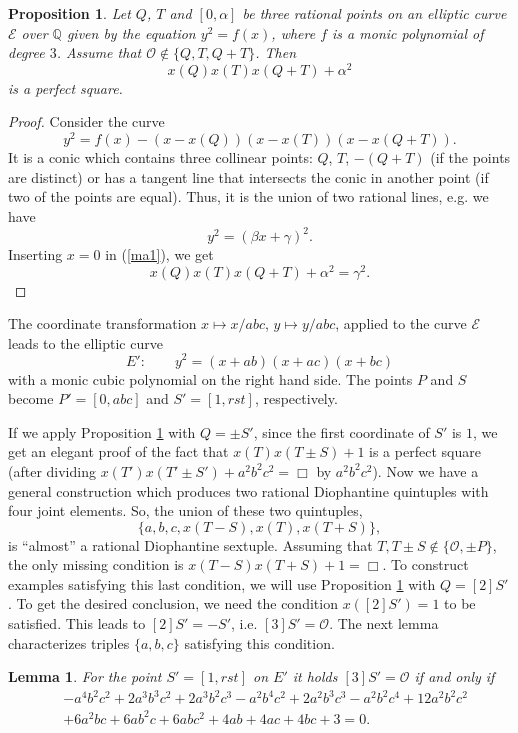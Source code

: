 \documentclass[11pt]{amsart}
\theoremstyle{plain}
\newtheorem{proposition}{Proposition}
\newtheorem{lemma}{Lemma}
\theoremstyle{remark}
\begin{document}
\begin{proposition}
\label{matija}
Let $Q$, $T$ and $[0,\alpha]$ be three rational points on an elliptic curve $\mathcal{E}$ over $\mathbb{Q}$
given by the equation $y^2=f(x)$, where $f$ is a monic polynomial of degree $3$.
Assume that $\mathcal{O} \not\in \{Q,T,Q+T\}$.
Then
$$ x(Q)x(T)x(Q+T)+ \alpha^2 $$
is a perfect square.
\end{proposition}

\begin{proof}
Consider the curve
$$
y^2 = f(x)-(x-x(Q))(x-x(T))(x-x(Q+T)).
$$
It is a conic which contains three collinear points: $Q$, $T$, $-(Q+T)$ (if the points are distinct) or has a tangent line that intersects the conic in another point (if two of the points are equal). Thus, it is the union of two rational lines, e.g. we have
\begin{equation}
\label{ma1}
y^2 = (\beta x + \gamma)^2.
\end{equation}
Inserting $x=0$ in (\ref{ma1}), we get
$$
x(Q)x(T)x(Q+T)+ \alpha^2 = \gamma^2.
$$
\end{proof}

The coordinate transformation $x\mapsto x/abc$, $y\mapsto y/abc$, applied to the curve $\mathcal{E}$
leads to the elliptic curve
$$ E': \qquad y^2=(x+ab)(x+ac)(x+bc) $$
with a monic cubic polynomial on the right hand side. The points $P$ and $S$ become
$P'=[0,abc]$ and $S'=[1, rst]$, respectively.

If we apply Proposition \ref{matija} with $Q=\pm S'$, since the first coordinate of $S'$ is $1$, we get an elegant proof of the fact that $x(T)x(T\pm S)+1$ is a perfect square (after dividing $x(T')x(T'\pm S') + a^2b^2c^2=\Box$ by $a^2b^2c^2$). Now we have a general construction which produces two rational Diophantine quintuples with four joint elements. So, the union of these two quintuples,
$$
\{a,b,c,x(T-S),x(T),x(T+S)\},
$$
is ``almost'' a rational Diophantine sextuple. Assuming that $T,T\pm S \not\in \{\mathcal{O}, \pm P\}$, the only missing condition is $x(T-S)x(T+ S)+1=\Box$. To construct examples satisfying this last condition, we will use Proposition \ref{matija} with $Q=[2]S'$. To get the desired conclusion, we need the condition $x([2]S')=1$ to be satisfied. This leads to $[2]S'=-S'$, i.e. $[3]S'=\mathcal{O}$. The next lemma characterizes triples $\{a,b,c\}$ satisfying this condition.

\begin{lemma}
\label{miljen}
For the point $S'=[1,rst]$ on $E'$ it holds $[3]S'=\mathcal{O}$ if and only if
\begin{eqnarray}
\label{mi1}
& -a^4b^2c^2+2a^3b^3c^2+2a^3b^2c^3-a^2b^4c^2+2a^2b^3c^3-a^2b^2c^4+12a^2b^2c^2 \nonumber \\
& +6a^2bc+6ab^2c+6abc^2+4ab+4ac+4bc+3=0.
\end{eqnarray}
\end{lemma}
\end{document}
